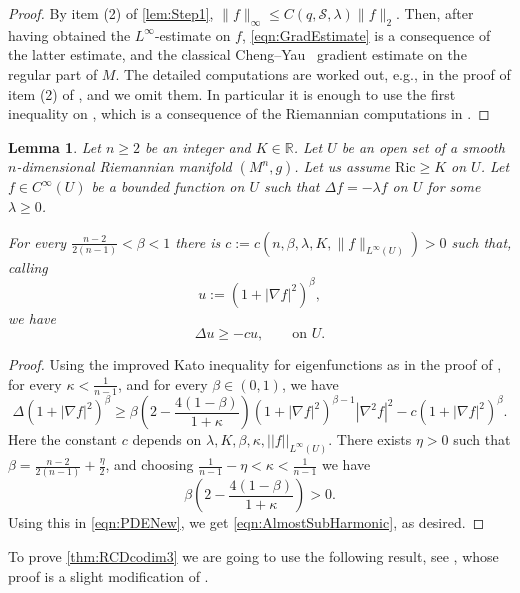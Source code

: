 \documentclass[12pt,a4paper,reqno]{amsart}
\newtheorem{lemma}[theorem]{Lemma}
\renewcommand{\leq}{\leqslant}
\renewcommand{\geq}{\geqslant}
\begin{document}
\begin{proof}
    By item (2) of \cref{lem:Step1}, $\|f\|_\infty\leq C(q,\mathcal{S},\lambda)\|f\|_2$. Then, after having obtained the $L^\infty$-estimate on $f$, \eqref{eqn:GradEstimate} is a consequence of the latter estimate, and the classical Cheng--Yau~\cite{ChengYau} gradient estimate on the regular part of $M$. The detailed computations are worked out, e.g., in the proof of item (2) of \cite[Lemma 2.7]{DWWW}, and we omit them. In particular it is enough to use the first inequality on \cite[Page 10]{DWWW}, which is a consequence of the Riemannian computations in \cite[Theorem 2.6]{DWWW}.
\end{proof}

\begin{lemma}\label{lem:Bochner++}
    Let $n\geq 2$ be an integer and $K\in\mathbb R$. Let $U$ be an open set of a smooth $n$-dimensional Riemannian manifold $(M^n,g)$. Let us assume $\mathrm{Ric}\geq K$ on $U$. Let $f\in C^{\infty}(U)$ be a bounded function on $U$ such that $\Delta f=-\lambda f$ on $U$ for some $\lambda\geq 0$.
    
    For every $\frac{n-2}{2(n-1)}<\beta<1$ there is $c:=c(n,\beta,\lambda, K,\|f\|_{L^{\infty}(U)})>0$ such that, calling 
    \[
    u:=(1+|\nabla f|^2)^{\beta},
    \]
    we have 
    \begin{equation}\label{eqn:AlmostSubHarmonic}
    \Delta u \geq -cu, \qquad \text{on $U$}.
    \end{equation}
\end{lemma}
\begin{proof}
    Using the improved Kato inequality for eigenfunctions as in the proof of \cite[Theorem 5.1]{CCHSTT}, for every $\kappa<\frac{1}{n-1}$, and for every $\beta\in (0,1)$, we have
\begin{equation}\label{eqn:PDENew}
\Delta (1 + |\nabla f|^2)^\beta \geq \beta\left(2-\frac{4(1-\beta)}{1+\kappa}\right) (1 + |\nabla f|^2)^{\beta-1} |\nabla^2 f|^2 - c (1+|\nabla f|^2)^\beta. 
\end{equation}
Here the constant $c$ depends on $\lambda, K,\beta,\kappa,||f||_{L^\infty(U)}$. There exists $\eta>0$ such that $\beta=\frac{n-2}{2(n-1)}+\frac{\eta}{2}$, and choosing $\frac{1}{n-1}-\eta<\kappa<\frac{1}{n-1}$ we have
\[
\beta\left(2-\frac{4(1-\beta)}{1+\kappa}\right) >0.
\]
Using this in \eqref{eqn:PDENew},
 we get \eqref{eqn:AlmostSubHarmonic}, as desired.
 \end{proof}

 To prove \cref{thm:RCDcodim3} we are going to use the following result, see \cite[Corollary 8]{Gabor}, whose proof is a slight modification of \cite[Corollary 3.10]{Honda}.
\end{document}
